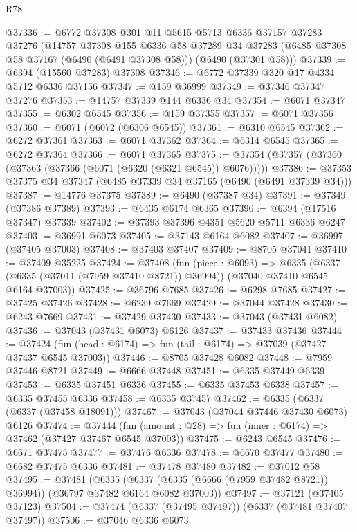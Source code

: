 \begin{lexlean}{R78}
\begin{coremodule}
@37336 := @6772
    @37308
    @301
    @11
    @5615
    @5713
    @6336
    @37157
    @37283
    @37276
    (@14757
      @37308
      @155
      @6336
      @58
      @37289
      @34
      @37283
      (@6485 @37308 @58 @37167 (@6490 (@6491 @37308 @58)))
      (@6490 (@37301 @58)))
@37339 := @6394 (@15560 @37283) @37308
@37346 := @6772 @37339 @320 @17 @4334 @5712 @6336 @37156
@37347 := @159 @36999
@37349 := @37346 @37347 @37276
@37353 := @14757 @37339 @144 @6336 @34
@37354 := @6071 @37347
@37355 := @6302 @6545
@37356 := @159 @37355
@37357 := @6071 @37356
@37360 := @6071 (@6072 (@6306 @6545))
@37361 := @6310 @6545
@37362 := @6272 @37361
@37363 := @6071 @37362
@37364 := @6314 @6545
@37365 := @6272 @37364
@37366 := @6071 @37365
@37375 := @37354 (@37357 (@37360 (@37363 (@37366 (@6071 (@6320 (@6321 @6545)) @6076)))))
@37386 := @37353 @37375 @34 @37347 (@6485 @37339 @34 @37165 (@6490 (@6491 @37339 @34)))
@37387 := @14776 @37375
@37389 := @6490 (@37387 @34)
@37391 := @37349 (@37386 @37389)
@37393 := @6435 @6174 @6365
@37396 := @6394 (@17516 @37347) @37339
@37402 := @37393 @37396 @4351 @5620 @5711 @6336 @6247
@37403 := @36991 @6073
@37405 := @37143 @6164 @6082
@37407 := @36997 (@37405 @37003)
@37408 := @37403 @37407
@37409 := @8705 @37041
@37410 := @37409 @35225
@37424 := @37408
    (fun (piece : @6093) =>
    @6335 (@6337 (@6335 (@37011 (@7959 @37410 @8721)) @36994)) (@37040 @37410 @6545 @6164 @37003))
@37425 := @36796 @7685
@37426 := @6298 @7685
@37427 := @37425 @37426
@37428 := @6239 @7669
@37429 := @37044 @37428
@37430 := @6243 @7669
@37431 := @37429 @37430
@37433 := @37043 (@37431 @6082)
@37436 := @37043 (@37431 @6073) @6126
@37437 := @37433 @37436
@37444 := @37424 (fun (head : @6174) => fun (tail : @6174) => @37039 (@37427 @37437 @6545 @37003))
@37446 := @8705 @37428 @6082
@37448 := @7959 @37446 @8721
@37449 := @6666 @37448
@37451 := @6335 @37449 @6339
@37453 := @6335 @37451 @6336
@37455 := @6335 @37453 @6338
@37457 := @6335 @37455 @6336
@37458 := @6335 @37457
@37462 := @6335 (@6337 (@6337 (@37458 @18091)))
@37467 := @37043 (@37044 @37446 @37430 @6073) @6126
@37474 := @37444 (fun (amount : @28) => fun (inner : @6174) => @37462 (@37427 @37467 @6545 @37003))
@37475 := @6243 @6545
@37476 := @6671 @37475
@37477 := @37476 @6336
@37478 := @6670 @37477
@37480 := @6682 @37475 @6336
@37481 := @37478 @37480
@37482 := @37012 @58
@37495 := @37481
    (@6335 (@6337 (@6335 (@6666 (@7959 @37482 @8721)) @36994)) (@36797 @37482 @6164 @6082 @37003))
@37497 := @37121 (@37405 @37123)
@37504 := @37474 (@6337 (@37495 @37497)) (@6337 (@37481 @37407 @37497))
@37506 := @37046 @6336 @6073

\end{coremodule}
\end{lexlean}
